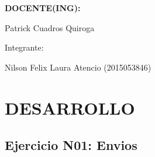 \documentclass[12pt,letterpaper]{article}
\begin{document}
\begin{titlepage}
\begin{center}
\vspace*{0.3in}
\begin{Large}
\textbf{DOCENTE(ING):} \\
\end{Large}

\vspace*{0.1in}
\begin{large}
 Patrick Cuadros Quiroga\\
\end{large}

\vspace*{0.2in}
\vspace*{0.1in}
\begin{large}
Integrante: \\
\begin{flushleft}
Nilson Felix Laura Atencio	\hfill	(2015053846) 
\end{flushleft}
\end{large}
\end{center}

\end{titlepage}



\thispagestyle{empty} %
\newpage
\setcounter{page}{1} %


\section{DESARROLLO}
\subsection{Ejercicio N01: Envios}
\end{document}
